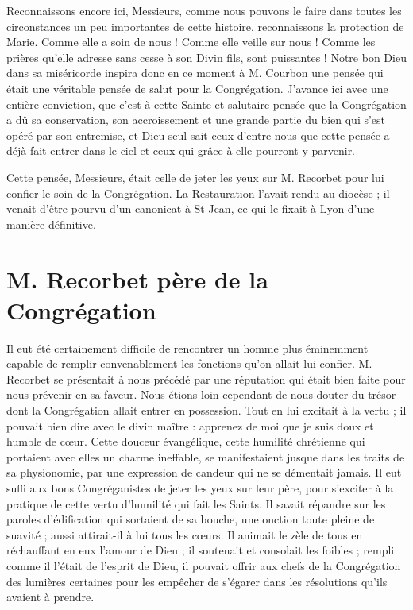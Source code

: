 Reconnaissons encore ici, Messieurs, comme nous pouvons le faire dans toutes les circonstances un peu importantes de cette histoire, reconnaissons la protection de Marie. Comme elle a soin de nous ! Comme elle veille sur nous ! Comme les prières qu'elle adresse sans cesse à son Divin fils, sont puissantes ! Notre bon Dieu dans sa miséricorde inspira donc en ce moment à M. Courbon une pensée qui était une véritable pensée de salut pour la Congrégation. J'avance ici avec une entière conviction, que c'est à cette Sainte et salutaire pensée que
la Congrégation a dû sa conservation, son accroissement et une grande partie du bien qui s'est opéré par son entremise, et Dieu seul sait ceux d'entre nous que cette pensée a déjà fait entrer dans le ciel et ceux qui grâce à elle pourront y parvenir.

Cette pensée, Messieurs, était celle de jeter les yeux sur M. Recorbet pour lui confier le soin de la Congrégation. La Restauration l'avait rendu au diocèse ; il venait d'être pourvu d'un canonicat à St Jean, ce qui le fixait à Lyon d'une manière définitive.

\section*{M. Recorbet père de la Congrégation}
Il eut été certainement difficile de rencontrer un homme plus éminemment capable de remplir convenablement les fonctions qu'on allait lui confier. M. Recorbet se présentait à nous précédé par une réputation qui était bien faite pour nous prévenir en sa faveur. Nous étions loin cependant de nous douter du trésor dont la Congrégation allait entrer en possession. Tout en lui excitait à la vertu ; il pouvait bien dire avec le divin maître : apprenez de moi que je suis doux et humble de cœur. Cette douceur évangélique, cette humilité chrétienne qui portaient avec elles un charme ineffable, se manifestaient jusque dans les traits de sa physionomie, par une expression de candeur qui ne se démentait jamais. Il eut suffi aux bons Congréganistes de jeter les yeux sur leur père, pour s'exciter à la pratique de cette vertu d'humilité qui fait les Saints. Il savait répandre sur les paroles d'édification qui sortaient de sa bouche, une onction toute pleine de suavité ; aussi attirait-il à lui tous les cœurs. Il animait le zèle de tous en réchauffant en eux l'amour de Dieu ; il soutenait et consolait les foibles ; rempli comme il l'était de l'esprit de Dieu, il
pouvait offrir aux chefs de la Congrégation des lumières certaines pour les empêcher de s'égarer dans les résolutions qu'ils avaient à prendre.

